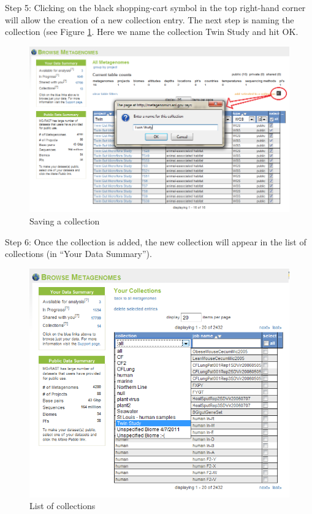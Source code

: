 \documentclass[12pt,fullpage]{report}
\begin{document}
Step 5: Clicking on the black shopping-cart symbol in the top right-hand corner will allow the creation of a new collection entry. The next step is naming the collection (see Figure \ref{fig:Collections-how-to-save}.
Here we name the collection Twin Study and hit OK.

\begin{figure}[ht]
\begin{center}
\includegraphics[width=6in]{Images/Collections-how-to-save.png}
\end{center}
\caption{
Saving a collection}
\label{fig:Collections-how-to-save}
\end{figure}


Step 6: Once the collection is added, the new collection will appear in the list of collections (in ``Your Data Summary”).

\begin{figure}[ht]
\begin{center}
\includegraphics[width=6in]{Images/collections-finished.png}
\end{center}
\caption{
List of collections}
\label{fig:collections-finished}
\end{figure}
\end{document}
